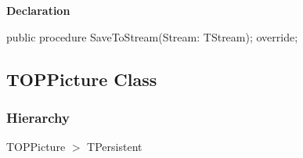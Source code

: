 \documentclass{report}
\newif\ifpdf
\begin{document}
\label{opbitmapformats.TTIFFImage-SaveToStream}
\begin{list}{}{
\setlength{\itemindent}{0cm}
\setlength{\listparindent}{0cm}
\setlength{\leftmargin}{\evensidemargin}
\addtolength{\leftmargin}{\tmplength}
\settowidth{\labelsep}{X}
\addtolength{\leftmargin}{\labelsep}
\setlength{\labelwidth}{\tmplength}
}
\item[\textbf{Declaration}\hfill]
\ifpdf
\begin{flushleft}
\fi
\begin{ttfamily}
public procedure SaveToStream(Stream: TStream); override;\end{ttfamily}

\ifpdf
\end{flushleft}
\fi

\end{list}
\ifpdf
\subsection*{\large{\textbf{TOPPicture Class}}\normalsize\hspace{1ex}\hrulefill}
\else
\subsection*{TOPPicture Class}
\fi
\label{opbitmapformats.TOPPicture}
\subsubsection*{\large{\textbf{Hierarchy}}\normalsize\hspace{1ex}\hfill}
TOPPicture {$>$} TPersistent
\end{document}
